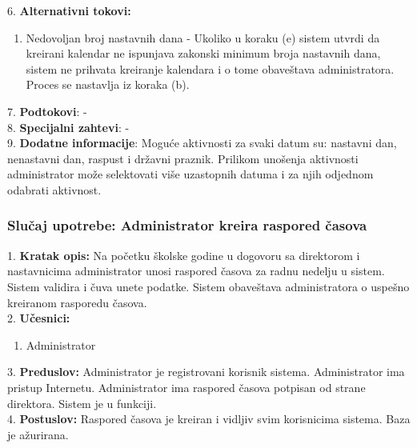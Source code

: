 \documentclass{article}
\begin{document}
6. \textbf{Alternativni tokovi:}
\begin{enumerate} [label=(\roman*)]
\item Nedovoljan broj nastavnih dana - Ukoliko u koraku (e) sistem utvrdi da kreirani kalendar ne ispunjava zakonski minimum broja nastavnih dana, sistem ne prihvata kreiranje kalendara i o tome obaveštava administratora. Proces se nastavlja iz koraka (b).
\end{enumerate}

7. \textbf{Podtokovi}:  - \\

8. \textbf{Specijalni zahtevi}: - \\

9. \textbf{Dodatne informacije}: Moguće aktivnosti za svaki datum su: nastavni dan, nenastavni dan, raspust i državni praznik. Prilikom unošenja aktivnosti administrator može selektovati više uzastopnih datuma i za njih odjednom odabrati aktivnost. \\


\subsubsection{Slučaj upotrebe: Administrator kreira raspored časova}
1. \textbf{Kratak opis:} Na početku školske godine u dogovoru sa direktorom i nastavnicima administrator unosi raspored časova za radnu nedelju u sistem. Sistem validira i čuva unete podatke. Sistem obaveštava administratora o uspešno kreiranom rasporedu časova. \\ 

2. \textbf{Učesnici:}
\begin{enumerate} [label=(\alph*)]
\item Administrator
\end{enumerate} 

3. \textbf{Preduslov:} Administrator je registrovani korisnik sistema. Administrator ima pristup Internetu. Administrator ima raspored časova potpisan od strane direktora. Sistem je u funkciji. \\

4. \textbf{Postuslov:} Raspored časova je kreiran i vidljiv svim korisnicima sistema. Baza je ažurirana. \\
\end{document}
